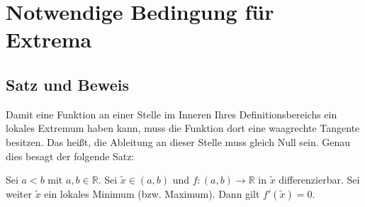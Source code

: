 \documentclass[fontsize=9pt,
               parskip=half-,
               DIV=14,
               listof=chapterentry,
               tocflat]{scrbook}
\begin{document}
\section{Notwendige Bedingung für Extrema}

\subsection{Satz und Beweis}

Damit eine Funktion an einer Stelle im Inneren Ihres Definitionsbereichs ein lokales Extremum haben kann, muss die Funktion dort eine waagrechte Tangente besitzen. Das heißt, die Ableitung an dieser Stelle muss gleich Null sein. Genau dies besagt der folgende Satz:

\begin{theorem*}
Sei $a<b$ mit $a,b\in \mathbb {R} $. Sei ${\tilde {x}}\in (a,b)$ und $f:(a,b)\to \mathbb {R} $ in ${\tilde {x}}$ differenzierbar. Sei weiter ${\tilde {x}}$ ein lokales Minimum (bzw. Maximum). Dann gilt $f'({\tilde {x}})=0$.

\end{theorem*}
\end{document}

